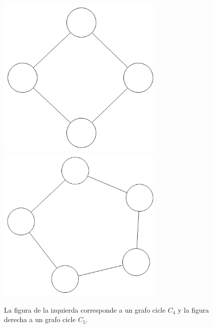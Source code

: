 \begin{figure}[H]
\includegraphics[width=80mm]{C_4.png}
\includegraphics[width=80mm]{C_5.png}
\caption{La figura de la izquierda corresponde a un grafo cicle $C_4$ y la figura derecha a un grafo cicle $C_5$.}
\label{overflow}
\end{figure}
